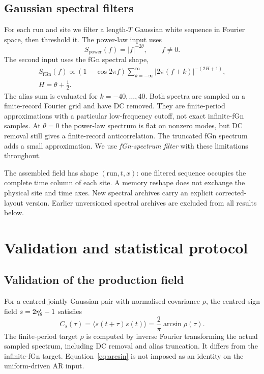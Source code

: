 \subsection{Gaussian spectral filters}
For each run and site we filter a length-$T$ Gaussian white sequence in Fourier
space, then threshold it. The power-law input uses
\begin{equation}
 S_{\mathrm{power}}(f)=|f|^{-2\theta},\qquad f\ne0.
 \label{eq:power}
\end{equation}
The second input uses the fGn spectral shape,
\begin{equation}
 \begin{gathered}
 S_{\mathrm{fGn}}(f)\propto(1-\cos2\pi f)
 \sum_{k=-\infty}^{\infty}|2\pi(f+k)|^{-(2H+1)},\\
 H=\theta+\tfrac12.
 \end{gathered}
 \label{eq:fgnspectrum}
\end{equation}
The alias sum is evaluated for $k=-40,\ldots,40$. Both spectra are sampled on
a finite-record Fourier grid and have DC removed. They are finite-period
approximations with a particular low-frequency cutoff, not exact infinite-fGn
samples. At $\theta=0$ the power-law spectrum is flat on nonzero modes, but
DC removal still gives a finite-record anticorrelation. The truncated fGn
spectrum adds a small approximation. We use \emph{fGn-spectrum filter} with
these limitations throughout.

The assembled field has shape $(\mathrm{run},t,x)$: one filtered sequence
occupies the complete time column of each site. A memory reshape does not
exchange the physical site and time axes. New spectral archives carry an
explicit corrected-layout version. Earlier unversioned spectral archives are
excluded from all results below.

\section{Validation and statistical protocol}
\label{sec:protocol}
\subsection{Validation of the production field}
For a centred jointly Gaussian pair with normalised covariance $\rho$, the
centred sign field $s=2\eta'_{\theta}-1$ satisfies
\begin{equation}
 C_s(\tau)=\langle s(t+\tau)s(t)\rangle=\frac2\pi\arcsin\rho(\tau).
 \label{eq:arcsin}
\end{equation}
The finite-period target $\rho$ is computed by inverse Fourier transforming
the actual sampled spectrum, including DC removal and alias truncation. It
differs from the infinite-fGn target. Equation~\eqref{eq:arcsin} is not imposed
as an identity on the uniform-driven AR input.

